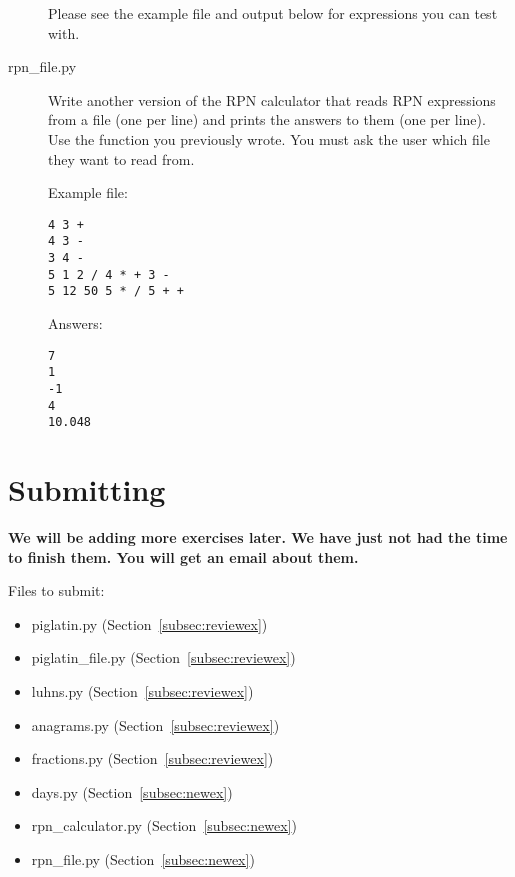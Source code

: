 \documentclass[11pt]{cselabheader}
\begin{document}
\begin{description}
    Please see the example file and output below for expressions you can test
    with.

  \item[rpn\_file.py] Write another version of the RPN calculator that reads
    RPN expressions from a file (one per line) and prints the answers to them
    (one per line). Use the function you previously wrote. You must ask the user
    which file they want to read from.

    Example file:
    \begin{lstlisting}
4 3 +
4 3 -
3 4 -
5 1 2 / 4 * + 3 -
5 12 50 5 * / 5 + +
    \end{lstlisting}

    Answers:
    \begin{lstlisting}
7
1
-1
4
10.048
    \end{lstlisting}
    
\end{description}

\pagebreak
\section{Submitting}

\begin{center}
  \textbf{We will be adding more exercises later. We have just not had the time
  to finish them. You will get an email about them.}
\end{center}

Files to submit:
\begin{itemize}
  \item piglatin.py (Section~\ref{subsec:reviewex})
  \item piglatin\_file.py (Section~\ref{subsec:reviewex})
  \item luhns.py (Section~\ref{subsec:reviewex})
  \item anagrams.py (Section~\ref{subsec:reviewex})
  \item fractions.py (Section~\ref{subsec:reviewex})
  \item days.py (Section~\ref{subsec:newex})
  \item rpn\_calculator.py (Section~\ref{subsec:newex})
  \item rpn\_file.py (Section~\ref{subsec:newex})
\end{itemize}
\end{document}
